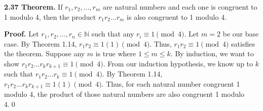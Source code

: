 \documentclass[12pt]{article}
\begin{document}
\noindent\textbf{2.37 Theorem.} If $r_1,r_2,...,r_m$ are natural numbers and each one is congruent to 1 modulo 4, then the product $r_1r_2...r_m$ is also congruent to 1 modulo 4.

\bigskip

\noindent\textbf{Proof.} Let $r_1,r_2,...,r_n\in\mathbb{N}$ such that any $r_i\equiv 1\pmod 4$. Let $m=2$ be our base case. By Theorem 1.14, $r_1r_2\equiv 1(1)\pmod 4$. Thus, $r_1r_2\equiv 1\pmod 4$ satisfies the theorem. Suppose any $m$ is true where $1\leq m\leq k$. By induction, we want to show $r_1r_2...r_kr_{k+1}\equiv 1\pmod 4$. From our induction hypothesis, we know up to $k$ such that $r_1r_2...r_k\equiv 1\pmod 4$. By Theorem 1.14, $r_1r_2...r_kr_{k+1}\equiv 1(1)\pmod 4$. Thus, for each natural number congruent 1 modulo 4, the product of those natural numbers are also congruent 1 modulo 4.\qed
\end{document}
